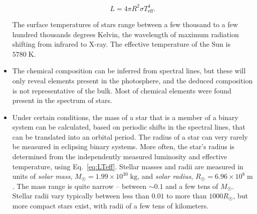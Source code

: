 \documentclass[10pt,amsmath,amssymb,aps,pra]{revtex4-2}
\newcommand{\unit}[1]{\;\mathrm{#1}}
\newcommand{\Sun}{\astrosun}
\begin{document}
\begin{itemize}
\begin{equation}\label{eq:LTeff}
L=4\pi{R}^2\sigma{T}_\text{eff}^4.
\end{equation}

The surface temperatures of stars range between a few thousand to a few hundred
thousands degrees Kelvin, the wavelength of maximum radiation shifting from
infrared to X-ray. The effective temperature of the Sun is $5780\unit{K}$.

\item The chemical composition can be inferred from spectral lines, but these
will only reveal elements present in the photosphere, and the deduced
composition is not representative of the bulk. Most of chemical elements were
found present in the spectrum of stars.

\item Under certain conditions, the mass of a star that is a member of a binary
system can be calculated, based on periodic shifts in the spectral lines, that
can be translated into an orbital period. The radius of a star can very rarely
be measured in eclipsing binary systems. More often, the star's radius is
determined from the independently measured luminosity and effective temperature,
using Eq.~\eqref{eq:LTeff}. Stellar masses and radii are measured in units of
\emph{solar mass}, $M_{\Sun}=1.99\times10^{30}\unit{kg}$, and \emph{solar
radius}, $R_{\Sun}=6.96\times10^8\unit{m}$. The mass range is quite narrow --
between $\sim{0.1}$ and a few tens of $M_{\Sun}$. Stellar radii vary typically
between less than $0.01$ to more than $1000 R_{\Sun}$, but more compact stars
exist, with radii of a few tens of kilometers.

\end{itemize}
\end{document}
